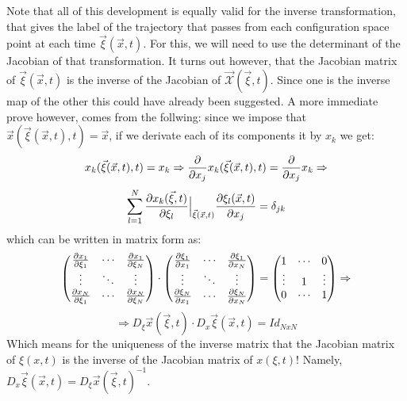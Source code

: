 \documentclass[11pt, a4paper]{article} %
\newcommand{\x}{\mathcal{X}}
\begin{document}
{Note that all of this development is equally valid for the inverse transformation, that gives the label of the trajectory that passes from each configuration space point at each time $\vec{\xi}(\vec{x},t)$. For this, we will need to use the determinant of the Jacobian of that transformation. It turns out however, that the Jacobian matrix of $\vec{\xi}(\vec{x},t)$ is the inverse of the Jacobian of $\vec{\x}(\vec{\xi},t)$. Since one is the inverse map of the other this could have already been suggested. A more immediate prove however, comes from the follwing: since we impose that $\vec{x}(\vec{\xi}(\vec{x},t),t)=\vec{x}$, if we derivate each of its components it by $x_k$ we get:
\begin{equation}
x_k(\vec{\xi}(\vec{x},t),t)=x_k \Rightarrow \pdv{}{x_j}x_k(\vec{\xi}(\vec{x},t),t)=\pdv{}{x_j}x_k \Rightarrow
\end{equation}
$$
\sum_{l=1}^N \pdv{x_k(\vec{\xi},t)}{\xi_l}\Big\rvert_{\vec{\xi}(\vec{x},t)}\pdv{\xi_l(\vec{x},t)}{x_j}=\delta_{jk}
$$
which can be written in matrix form as:
\begin{equation}\label{inverse}
\begin{pmatrix}
\pdv{x_1}{\xi_1}&\cdots&\pdv{x_1}{\xi_N} \\
\vdots &\ddots& \vdots \\
\pdv{x_N}{\xi_1}&\cdots&\pdv{x_N}{\xi_N}
\end{pmatrix}\cdot \begin{pmatrix}
\pdv{\xi_1}{x_1}&\cdots&\pdv{\xi_1}{x_N} \\
\vdots & \ddots & \vdots \\
\pdv{\xi_N}{x_1}&\cdots&\pdv{\xi_N}{x_N}
\end{pmatrix}=\begin{pmatrix}
1&\cdots &0 \\
\vdots & 1& \vdots \\
0&\cdots &1
\end{pmatrix}\Rightarrow
\end{equation}
$$
\Rightarrow D_\xi \vec{x}(\vec{\xi},t)\cdot D_x \vec{\xi}(\vec{x},t) = Id_{NxN}
$$
Which means for the uniqueness of the inverse matrix that the Jacobian matrix of $\xi(x,t)$ is the inverse of the Jacobian matrix of $x(\xi,t)$! Namely, $D_x \vec{\xi}(\vec{x},t)=D_\xi \vec{x}(\vec{\xi},t)^{-1}$.
}
\end{document}
